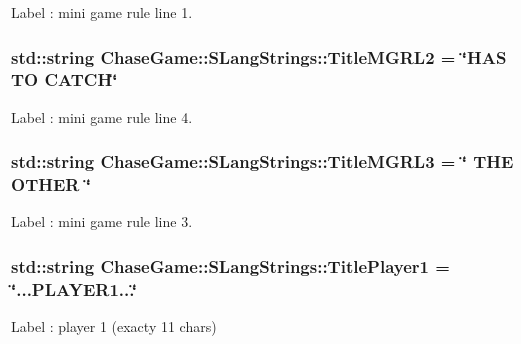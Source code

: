 Label \-: mini game rule line 1. 

\hypertarget{struct_chase_game_1_1_s_lang_strings_a0067f97060a17ea45752765221a80a7b}{
\subsubsection[{Title\-M\-G\-R\-L2}]{\setlength{\rightskip}{0pt plus 5cm}std\-::string Chase\-Game\-::\-S\-Lang\-Strings\-::\-Title\-M\-G\-R\-L2 = \char`\"{}H\-A\-S T\-O C\-A\-T\-C\-H\char`\"{}}}\label{struct_chase_game_1_1_s_lang_strings_a0067f97060a17ea45752765221a80a7b}


Label \-: mini game rule line 4. 

\hypertarget{struct_chase_game_1_1_s_lang_strings_af09837dc3975dc46a32092fa63824a09}{
\subsubsection[{Title\-M\-G\-R\-L3}]{\setlength{\rightskip}{0pt plus 5cm}std\-::string Chase\-Game\-::\-S\-Lang\-Strings\-::\-Title\-M\-G\-R\-L3 = \char`\"{} T\-H\-E O\-T\-H\-E\-R \char`\"{}}}\label{struct_chase_game_1_1_s_lang_strings_af09837dc3975dc46a32092fa63824a09}


Label \-: mini game rule line 3. 

\hypertarget{struct_chase_game_1_1_s_lang_strings_a95282707ee9c1c83bcb44ef4a167ba67}{
\subsubsection[{Title\-Player1}]{\setlength{\rightskip}{0pt plus 5cm}std\-::string Chase\-Game\-::\-S\-Lang\-Strings\-::\-Title\-Player1 = \char`\"{}...P\-L\-A\-Y\-E\-R1...\char`\"{}}}\label{struct_chase_game_1_1_s_lang_strings_a95282707ee9c1c83bcb44ef4a167ba67}


Label \-: player 1 (exacty 11 chars) 

